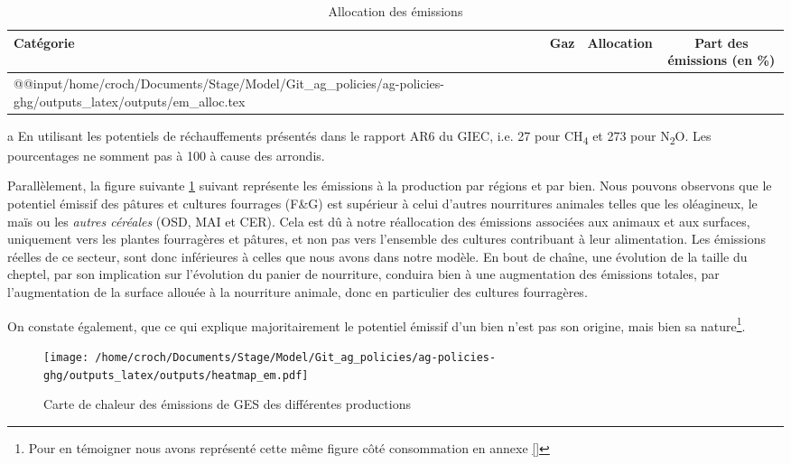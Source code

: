 \begin{table}[h!]
    \centering
    \begin{threeparttable}
        \begin{tabularx}{\textwidth}{p{1.77in}p{0.95in}p{1.19in}c}
            \textbf{Catégorie} & \textbf{Gaz} & \textbf{Allocation} & \textbf{Part des émissions}\tnote{a} (en \%) \\ \hline
            \csname @@input\endcsname /home/croch/Documents/Stage/Model/Git_ag_policies/ag-policies-ghg/outputs_latex/outputs/em_alloc.tex
            \hline
        \end{tabularx}
        \begin{tablenotes}
            \footnotesize
            \item[a] En utilisant les potentiels de réchauffements présentés dans le rapport AR6 du GIEC, i.e. 27 pour CH\textsubscript{4} et 273 pour N\textsubscript{2}O. Les pourcentages ne somment pas à 100 à cause des arrondis.
        \end{tablenotes}
        \caption{Allocation des émissions}
        \label{tab:em_allocation}
    \end{threeparttable}
\end{table}

Parallèlement, la figure suivante \ref{fig:em} suivant représente les émissions à la production par régions et par bien. Nous pouvons observons que le potentiel émissif des pâtures et cultures fourrages (F\&G) est supérieur à celui d'autres nourritures animales telles que les oléagineux, le maïs ou les \textit{autres céréales} (OSD, MAI et CER). Cela est dû à notre réallocation des émissions associées aux animaux et aux surfaces, uniquement vers les plantes fourragères et pâtures, et non pas vers l'ensemble des cultures contribuant à leur alimentation. Les émissions réelles de ce secteur, sont donc inférieures à celles que nous avons dans notre modèle. En bout de chaîne, une évolution de la taille du cheptel, par son implication sur l'évolution du panier de nourriture, conduira bien à une augmentation des émissions totales, par l'augmentation de la surface allouée à la nourriture animale, donc en particulier des cultures fourragères.

On constate également, que ce qui explique majoritairement le potentiel émissif d'un bien n'est pas son origine, mais bien sa nature\footnote{Pour en témoigner nous avons représenté cette même figure côté consommation en annexe \ref{}}.

\begin{figure}[h!]
    \centering
    \centering
    \texttt{[image: /home/croch/Documents/Stage/Model/Git\_ag\_policies/ag-policies-ghg/outputs\_latex/outputs/heatmap\_em.pdf]}
    \caption{Carte de chaleur des émissions de GES des différentes productions}
    \label{fig:em}
\end{figure}

